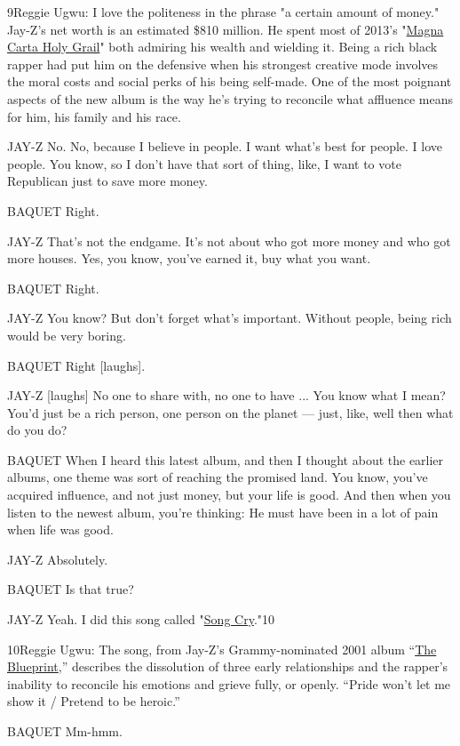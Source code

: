 9Reggie Ugwu: I love the politeness in the phrase "a certain amount of
money." Jay-Z's net worth is an estimated \$810 million. He spent most
of 2013's
"\href{https://open.spotify.com/album/37uqAKt9dLsLob7yomDWY4}{Magna
Carta Holy Grail}" both admiring his wealth and wielding it. Being a
rich black rapper had put him on the defensive when his strongest
creative mode involves the moral costs and social perks of his being
self-made. One of the most poignant aspects of the new album is the way
he's trying to reconcile what affluence means for him, his family and
his race.

JAY-Z No. No, because I believe in people. I want what's best for
people. I love people. You know, so I don't have that sort of thing,
like, I want to vote Republican just to save more money.

BAQUET Right.

JAY-Z That's not the endgame. It's not about who got more money and who
got more houses. Yes, you know, you've earned it, buy what you want.

BAQUET Right.

JAY-Z You know? But don't forget what's important. Without people, being
rich would be very boring.

BAQUET Right {[}laughs{]}.

JAY-Z {[}laughs{]} No one to share with, no one to have ... You know
what I mean? You'd just be a rich person, one person on the planet ---
just, like, well then what do you do?

BAQUET When I heard this latest album, and then I thought about the
earlier albums, one theme was sort of reaching the promised land. You
know, you've acquired influence, and not just money, but your life is
good. And then when you listen to the newest album, you're thinking: He
must have been in a lot of pain when life was good.

JAY-Z Absolutely.

BAQUET Is that true?

JAY-Z Yeah. I did this song called
"\href{https://www.youtube.com/watch?v=w5srnNrICJo}{Song Cry}."10

10Reggie Ugwu: The song, from Jay-Z's Grammy-nominated 2001 album
``\href{https://open.spotify.com/album/69CmkikTHkGKdkrUZTtyWl}{The
Blueprint},'' describes the dissolution of three early relationships and
the rapper's inability to reconcile his emotions and grieve fully, or
openly. ``Pride won't let me show it / Pretend to be heroic.''

BAQUET Mm-hmm.

